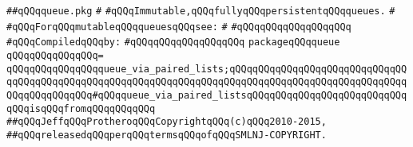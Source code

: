 \label{src/lib/src/queue.pkg}
\verb|##qQQqqueue.pkg|\newline
\verb|#|\newline
\verb|#qQQqImmutable,qQQqfullyqQQqpersistentqQQqqueues.|\newline
\verb|#|\newline
\verb|#qQQqForqQQqmutableqQQqqueuesqQQqsee:|\newline
\verb|#|\newline
\verb|#qQQqqQQqqQQqqQQqqQQq|\newline
\newline
\verb|#qQQqCompiledqQQqby:|\newline
\verb|#qQQqqQQqqQQqqQQqqQQq|\newline
\newline
\verb|packageqQQqqueue|\newline
\verb|qQQqqQQqqQQqqQQq=|\newline
\verb|qQQqqQQqqQQqqQQqqueue_via_paired_lists;qQQqqQQqqQQqqQQqqQQqqQQqqQQqqQQqqQQqqQQqqQQqqQQqqQQqqQQqqQQqqQQqqQQqqQQqqQQqqQQqqQQqqQQqqQQqqQQqqQQqqQQqqQQqqQQqqQQq#qQQqqueue_via_paired_listsqQQqqQQqqQQqqQQqqQQqqQQqqQQqqQQqisqQQqfromqQQqqQQqqQQq|\newline
\newline
\newline
\newline
\verb|##qQQqJeffqQQqProtheroqQQqCopyrightqQQq(c)qQQq2010-2015,|\newline
\verb|##qQQqreleasedqQQqperqQQqtermsqQQqofqQQqSMLNJ-COPYRIGHT.|\newline

